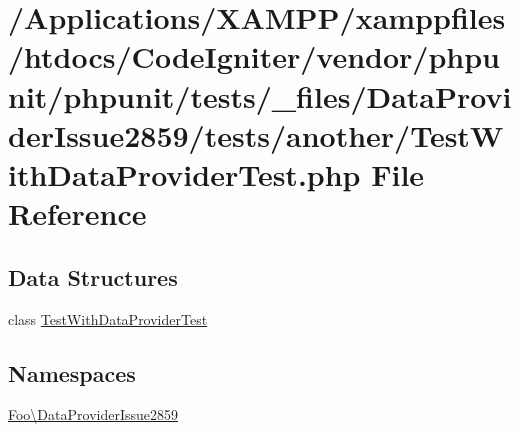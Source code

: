 \hypertarget{_test_with_data_provider_test_8php}{}\section{/\+Applications/\+X\+A\+M\+P\+P/xamppfiles/htdocs/\+Code\+Igniter/vendor/phpunit/phpunit/tests/\+\_\+files/\+Data\+Provider\+Issue2859/tests/another/\+Test\+With\+Data\+Provider\+Test.php File Reference}
\label{_test_with_data_provider_test_8php}
\subsection*{Data Structures}
\begin{DoxyCompactItemize}
\item 
class \mbox{\hyperlink{class_foo_1_1_data_provider_issue2859_1_1_test_with_data_provider_test}{Test\+With\+Data\+Provider\+Test}}
\end{DoxyCompactItemize}
\subsection*{Namespaces}
\begin{DoxyCompactItemize}
\item 
 \mbox{\hyperlink{namespace_foo_1_1_data_provider_issue2859}{Foo\textbackslash{}\+Data\+Provider\+Issue2859}}
\end{DoxyCompactItemize}
